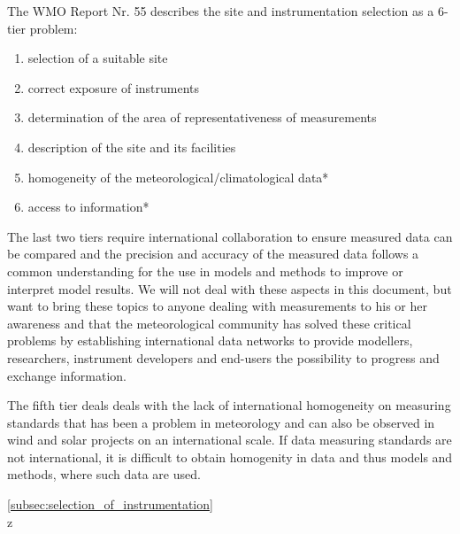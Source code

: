The WMO Report Nr. 55 \cite{wmoreport1993} describes the site and instrumentation selection as a 6-tier problem:
\begin{enumerate}
    \vspace{-0.2cm}\item selection of a suitable site
    \vspace{-0.4cm}\item correct exposure of instruments
    \vspace{-0.4cm}\item determination of the area of representativeness of measurements
    \vspace{-0.4cm}\item description of the site and its facilities
    \vspace{-0.4cm}\item homogeneity of the meteorological/climatological data*
    \vspace{-0.4cm}\item access to information* 
\end{enumerate}

The last two tiers require international collaboration to ensure measured data can be compared and the precision and accuracy of the measured data follows a common understanding for the use in models and methods to improve or interpret model results. We will not deal with these aspects in this document, but want to bring these topics to anyone dealing with measurements to his or her awareness and that the meteorological community has solved these critical problems by establishing international data networks to provide modellers, researchers, instrument developers and end-users the possibility to progress and exchange information. 

The fifth tier deals deals with the lack of international homogeneity on measuring standards that has been a problem in meteorology and can also be observed in wind and solar projects on an international scale. If data measuring standards are not international, it is difficult to obtain homogenity in data and thus models and methods, where such data are used. 


{\color{magenta}{comment SW: I think the following text should be deleted. this belongs to the section "selection of instruments"}\ref{subsec:selection_of_instrumentation}}
\\
{}z







